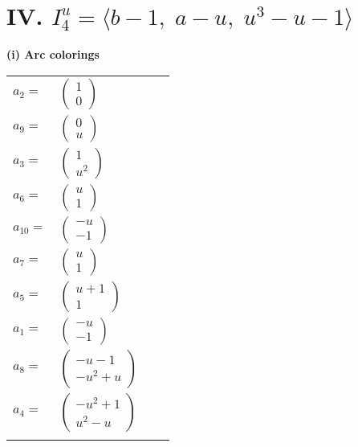 \documentclass[1p]{elsarticle_modified}
\theoremstyle{definition}
\begin{document}
\centering \section*{IV. $I^u_{4}= \langle b-1,\;a- u,\;u^3- u-1 \rangle$}
\flushleft \textbf{(i) Arc colorings}\\
\begin{tabular}{m{7pt} m{180pt} m{7pt} m{180pt} }
\flushright $a_{2}=$&$\begin{pmatrix}1\\0\end{pmatrix}$ \\
\flushright $a_{9}=$&$\begin{pmatrix}0\\u\end{pmatrix}$ \\
\flushright $a_{3}=$&$\begin{pmatrix}1\\u^2\end{pmatrix}$ \\
\flushright $a_{6}=$&$\begin{pmatrix}u\\1\end{pmatrix}$ \\
\flushright $a_{10}=$&$\begin{pmatrix}- u\\-1\end{pmatrix}$ \\
\flushright $a_{7}=$&$\begin{pmatrix}u\\1\end{pmatrix}$ \\
\flushright $a_{5}=$&$\begin{pmatrix}u+1\\1\end{pmatrix}$ \\
\flushright $a_{1}=$&$\begin{pmatrix}- u\\-1\end{pmatrix}$ \\
\flushright $a_{8}=$&$\begin{pmatrix}- u-1\\- u^2+u\end{pmatrix}$ \\
\flushright $a_{4}=$&$\begin{pmatrix}- u^2+1\\u^2- u\end{pmatrix}$\\&\end{tabular}
\end{document}
